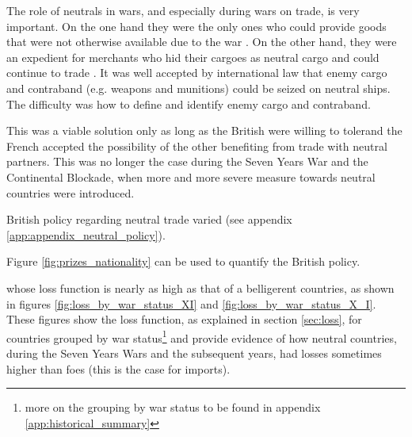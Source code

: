 \documentclass[12pt,a4paper,notitlepage,english]{article}
\begin{document}
 
%

The role of neutrals in wars, and especially during wars on trade, is very important.
On the one hand they were the only ones who could provide goods that were not otherwise available due to the war \citep{Hedberg2015}.
On the other hand, they were an expedient for merchants who hid their cargoes as neutral cargo and could continue to trade \cite[see][]{Carriere1973,Schnakenbourg2013,Schnakenbourg2015}. 
It was well accepted by international law that enemy cargo and contraband (e.g. weapons and munitions) could be seized on neutral ships.
The difficulty was how to define and identify enemy cargo and contraband.

This was a viable solution only as long as the British were willing to tolerand the French accepted the possibility of the other benefiting from trade with neutral partners. This was no longer the case during the Seven Years War and the Continental Blockade, when more and more severe measure towards neutral countries were introduced. 

British policy regarding neutral trade varied (see appendix \ref{app:appendix_neutral_policy}).


Figure \ref{fig:prizes_nationality} can be used to quantify the British policy.



whose loss function is nearly as high as that of a belligerent countries, as shown in figures \ref{fig:loss_by_war_status_XI} and \ref{fig:loss_by_war_status_X_I}.
These figures show the loss function, as explained in section \ref{sec:loss}, for countries grouped by war status\footnote{more on the grouping by war status to be found in appendix \ref{app:historical_summary}} and provide evidence of how neutral countries, during the Seven Years Wars and the subsequent years, had losses sometimes higher than foes (this is the case for imports). 
\end{document}
